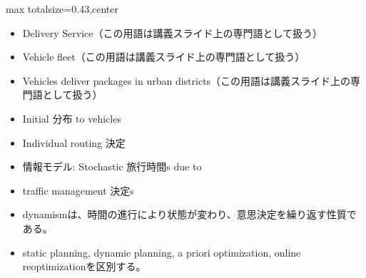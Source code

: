 \clearpage
{}
\begin{minipage}[t]{0.405\textwidth}
\begin{adjustbox}{max totalsize={\textwidth}{0.43\textheight},center}
\begin{minipage}{\textwidth}\scriptsize
{}\begin{itemize}
\item Delivery Service（この用語は講義スライド上の専門語として扱う）
\item Vehicle fleet（この用語は講義スライド上の専門語として扱う）
\item Vehicles deliver packages in urban districts（この用語は講義スライド上の専門語として扱う）
\item Initial 分布 to vehicles
\item Individual routing 決定
\item 情報モデル: Stochastic 旅行時間s due to
\item traffic management 決定s
\end{itemize}\begin{itemize}
\item dynamismは、時間の進行により状態が変わり、意思決定を繰り返す性質である。
\item static planning, dynamic planning, a priori optimization, online reoptimizationを区別する。
\end{itemize}
\end{minipage}
\end{adjustbox}
\end{minipage}\hfill
